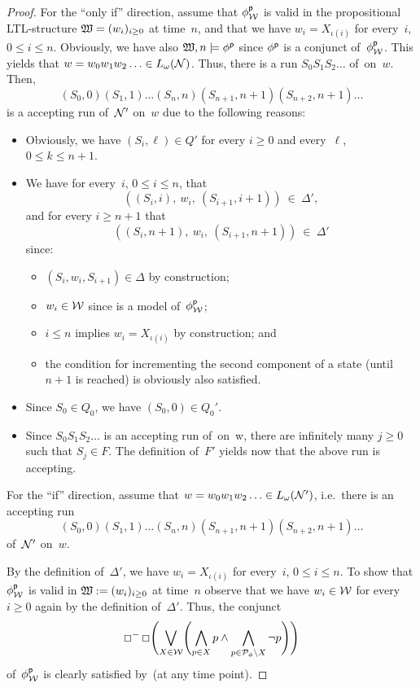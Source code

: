 \begin{proof}
    For the \enquote{only if} direction, assume that $\phi^\mathsf{p}_\mathcal{W}$ is valid
    in the propositional LTL-structure $\mathfrak{W}=(w_i)_{i\ge 0}$ at time~$n$, and
    that we have $w_i=X_{\iota(i)}$ for every~$i$, $0\le i\le n$.
    Obviously, we have also $\mathfrak{W},n\models\phi^\mathsf{p}$ since $\phi^\mathsf{p}$ is a
    conjunct of~$\phi^\mathsf{p}_\mathcal{W}$.  This yields that
    $w=w_0w_1w_2\dotso\in L_\omega(\mathcal{N})$.  Thus, there is a run $S_0S_1S_2\dots$
    of~\Nmc on~$w$.  Then,
    \[(S_0,0)(S_1,1)\dots(S_n,n)(S_{n+1},n+1)(S_{n+2},n+1)\dots\]
    is a accepting run of~$\mathcal{N}'$ on~$w$ due to the following reasons:
    \begin{itemize}
        \item Obviously, we have $(S_i,\ell)\in Q'$ for every $i\ge 0$ and
            every~$\ell$, $0\le k\le n+1$.
        \item We have for every~$i$, $0\le i\le n$, that
            \[((S_i,i),\ w_i,\ (S_{i+1},i+1))\ \in\ \Delta',\]
            and for every $i\ge n+1$ that
            \[((S_i,n+1),\ w_i,\ (S_{i+1},n+1))\ \in\ \Delta'\]
            since:
            \begin{itemize}
                \item $(S_i,w_i,S_{i+1})\in\Delta$ by construction;
                \item $w_i\in\mathcal{W}$ since \Wmf is a model of~$\phi^\mathsf{p}_\mathcal{W}$;
                \item $i\le n$ implies $w_i=X_{\iota(i)}$ by construction; and
                \item the condition for incrementing the second component of a
                    state (until $n+1$ is reached) is obviously also satisfied.
            \end{itemize}
        \item Since $S_0\in Q_0$, we have $(S_0,0)\in Q_0'$.
        \item Since $S_0S_1S_2\dots$ is an accepting run of~\Nmc on~w, there are
            infinitely many $j\ge 0$ such that $S_j\in F$.  The definition
            of~$F'$ yields now that the above run is accepting.
    \end{itemize}

    For the \enquote{if} direction, assume that
    $w=w_0w_1w_2\dotso\in L_\omega(\mathcal{N}')$, i.e.~there is an accepting run
    \[(S_0,0)(S_1,1)\dots(S_n,n)(S_{n+1},n+1)(S_{n+2},n+1)\dots\]
    of~$\mathcal{N}'$ on~$w$.

    By the definition of~$\Delta'$, we have $w_i=X_{\iota(i)}$ for every~$i$,
    $0\le i\le n$.
    To show that $\phi^\mathsf{p}_\mathcal{W}$ is valid in $\mathfrak{W}:=(w_i)_{i\ge 0}$ at time~$n$
    observe that we have $w_i\in\mathcal{W}$ for every $i\ge 0$ again by the definition
    of~$\Delta'$.  Thus, the conjunct
    \[\Boxm\Box\Biggl(\bigvee_{X\in\Wmc}\Biggl(\bigwedge_{p\in X}p\land%
        \bigwedge_{p\in\Pmc_\phi\setminus X}\lnot p\Biggr)\Biggr)\]
    of~$\phi^\mathsf{p}_\mathcal{W}$ is clearly satisfied by~\Wmf (at any time point).


\end{proof}
